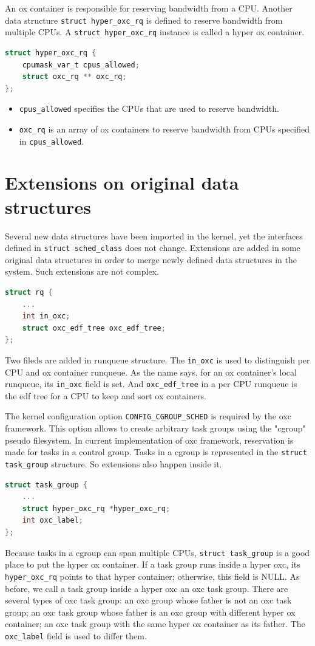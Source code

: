 An ox container is responsible for reserving bandwidth from a CPU.
Another data structure \texttt{struct hyper\_oxc\_rq} is defined to 
reserve bandwidth from multiple CPUs. A \texttt{struct hyper\_oxc\_rq}
instance is called a hyper ox container. 
\begin{lstlisting}[language=C, caption={The hyper ox container}]
struct hyper_oxc_rq {
	cpumask_var_t cpus_allowed;
	struct oxc_rq ** oxc_rq;
};
\end{lstlisting}
\begin{itemize}
\item \texttt{cpus\_allowed} specifies the CPUs that are used to reserve 
				bandwidth.
\item \texttt{oxc\_rq} is an array of ox containers to reserve bandwidth 
		from CPUs specified in \texttt{cpus\_allowed}.
\end{itemize}

\section{Extensions on original data structures}
Several new data structures have been imported in the kernel, yet 
the interfaces defined in \texttt{struct sched\_class} does not change.
Extensions are added in some original data structures in order to merge
newly defined data structures in the system. Such extensions are not complex.
\begin{lstlisting}[language=C, caption={Extensions in \texttt{struct rq}}]
struct rq {
	...
	int in_oxc;
	struct oxc_edf_tree oxc_edf_tree;
};
\end{lstlisting}
Two fileds are added in runqueue structure. The \texttt{in\_oxc} is 
used to distinguish per CPU and ox container runqueue.
As the name says, for an ox container's local runqueue, its 
\texttt{in\_oxc} field is set. And \texttt{oxc\_edf\_tree} in a 
per CPU runqueue is the edf tree for a CPU to keep and sort ox
containers.

The kernel configuration option \texttt{CONFIG\_CGROUP\_SCHED} is required
by the oxc framework. This option allows to create arbitrary task groups
using the "cgroup" pseudo filesystem. In current implementation of oxc 
framework, reservation is made for tasks in a control group. Tasks in a 
cgroup is represented in the \texttt{struct task\_group} structure. So 
extensions also happen inside it.
\begin{lstlisting}[language=C, caption={Extensions in 
						\texttt{struct task\_group}}]
struct task_group {
	...
	struct hyper_oxc_rq *hyper_oxc_rq;
	int oxc_label;
};
\end{lstlisting}
Because tasks in a cgroup can span multiple CPUs, \texttt{struct task\_group}
is a good place to put the hyper ox container.
If a task group runs inside a hyper oxc, its \texttt{hyper\_oxc\_rq} points 
to that hyper container; otherwise, this field is NULL. As before, we call
a task group inside a hyper oxc an oxc task group.
There are several types of oxc task group: an oxc group whose father
is not an oxc task group; an oxc task group whose father is an oxc group
with different hyper ox container; an oxc task group with the same hyper
ox container as its father. The \texttt{oxc\_label} field is used to 
differ them.

